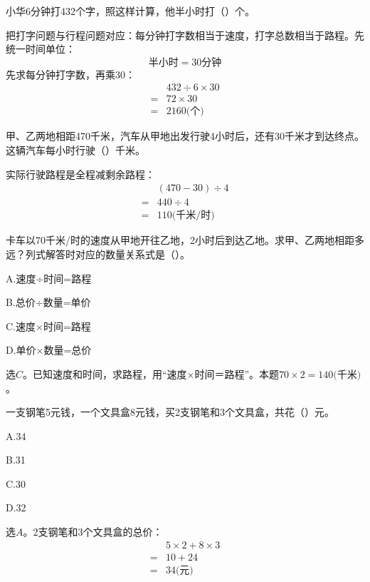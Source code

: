 小华6分钟打432个字，照这样计算，他半小时打（\hspace{1.8em}）个。\par
\begin{BookAnswer}
把打字问题与行程问题对应：每分钟打字数相当于速度，打字总数相当于路程。先统一时间单位：\[\text{半小时}=30\text{分钟}\]先求每分钟打字数，再乘30：\[\begin{aligned} &432\div6\times30\\={}&72\times30\\={}&2160\text{(个)}\end{aligned}\]
\end{BookAnswer}

甲、乙两地相距470千米，汽车从甲地出发行驶4小时后，还有30千米才到达终点。这辆汽车每小时行驶（\hspace{1.8em}）千米。\par
\begin{BookAnswer}
实际行驶路程是全程减剩余路程：\[\begin{aligned} &(470-30)\div4\\={}&440\div4\\={}&110\text{(千米/时)}\end{aligned}\]
\end{BookAnswer}

卡车以70千米/时的速度从甲地开往乙地，2小时后到达乙地。求甲、乙两地相距多远？列式解答时对应的数量关系式是（\hspace{1.8em}）。\par
\noindent A.速度÷时间=路程\par
\noindent B.总价÷数量=单价\par
\noindent C.速度×时间=路程\par
\noindent D.单价×数量=总价\par
\begin{BookAnswer}
选\(C\)。已知速度和时间，求路程，用“速度×时间＝路程”。本题\(70\times2=140\text{(千米)}\)。
\end{BookAnswer}

一支钢笔5元钱，一个文具盒8元钱，买2支钢笔和3个文具盒，共花（\hspace{1.8em}）元。\par
\noindent A.34\par
\noindent B.31\par
\noindent C.30\par
\noindent D.32\par
\begin{BookAnswer}
选\(A\)。2支钢笔和3个文具盒的总价：\[\begin{aligned} &5\times2+8\times3\\={}&10+24\\={}&34\text{(元)}\end{aligned}\]
\end{BookAnswer}

